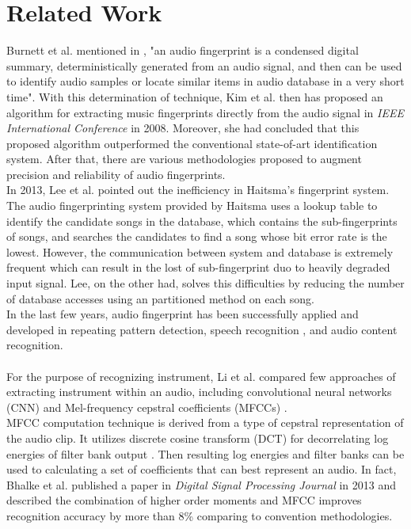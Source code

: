 \documentclass[whitelogo,12pt]{tudelft-report}
\begin{document}
\section{Related Work}
Burnett et al. mentioned in \cite{burnett2006}, "an audio fingerprint is a condensed digital summary, deterministically generated from an audio signal, and then can be used to identify audio samples or locate similar items in audio database in a very short time". With this determination of technique, Kim et al. then has proposed an algorithm for extracting music fingerprints directly from the audio signal in \textit{IEEE International Conference} in 2008\cite{kim2008}. Moreover, she had concluded that this proposed algorithm outperformed the conventional state-of-art identification system. After that, there are various methodologies proposed to augment precision and reliability of audio fingerprints.
\\
\indent In 2013, Lee et al. \cite{lee2013} pointed out the inefficiency in Haitsma's fingerprint system\cite{kalker2009}. The audio fingerprinting system provided by Haitsma uses a lookup table to identify the candidate songs in the database, which contains the sub-fingerprints of songs, and searches the candidates to find a song whose bit error rate is the lowest. However, the communication between system and database is extremely frequent which can result in the lost of sub-fingerprint duo to heavily degraded input signal. Lee, on the other had, solves this difficulties by reducing the number of database accesses using an partitioned method on each song.
\\
\indent In the last few years, audio fingerprint has been successfully applied and developed in repeating pattern detection\cite{chen2015}, speech recognition \cite{sharifi2015}, and audio content recognition\cite{jo2016}.
\\
\\
For the purpose of recognizing instrument, Li et al. compared few approaches of extracting instrument within an audio, including convolutional neural networks (CNN) and Mel-frequency cepstral coefficients (MFCCs) \cite{li2015}. 
\\
\indent MFCC computation technique is derived from a type of cepstral representation of the audio clip. It utilizes discrete cosine transform (DCT) for decorrelating log energies of filter bank output \cite{sahidullah2012}. Then resulting log energies and filter banks can be used to calculating a set of coefficients that can best represent an audio. In fact, Bhalke et al. published a paper in \textit{Digital Signal Processing Journal} in 2013 \cite{bhalke2013} and described the combination of higher order moments and MFCC improves recognition accuracy by more than 8\% comparing to convention methodologies.
\end{document}
